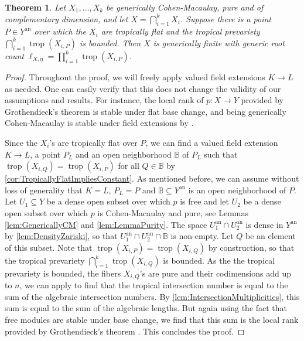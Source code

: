 \documentclass[12pt,reqno,a4paper]{amsart}
\theoremstyle{theoremstyle}
\newtheorem{theorem}{Theorem}[section]
\theoremstyle{examplestyle}
\theoremstyle{algorithmstyle}
\newcommand{\an}{{\mathrm{an}}}
\DeclareMathOperator{\trop}{trop}
\begin{document}
%
\begin{theorem}\label{thm:MainThm1}
  Let $X_1,\dots,X_k$ be generically Cohen-Macaulay, pure and of complementary dimension, and let $X=\bigcap_{i=1}^k X_i$.
  Suppose there is a point $P\in Y^{\an}$ over which the $X_{i}$ are tropically flat and the tropical prevariety $\bigcap_{i=1}^{k}\trop(X_{i,P})$ is bounded.
  Then $X$ is generically finite with generic root count $\ell_{X,\eta}=\prod_{i=1}^{k}\trop(X_{i,P})$.
\end{theorem}
\begin{proof}
Throughout the proof, we will freely apply valued field extensions $K\to L$ as needed. One can easily verify that this does not change the validity of our assumptions and results. For instance, the local  %
rank of $p\colon X\to Y$ provided by Grothendieck's theorem \cite[\href{https://stacks.math.columbia.edu/tag/052A}{Proposition 052A}]{stacks-project} is stable under flat base change, and
%
being generically Cohen-Macaulay is stable under field extensions by   %
%
%
\cite[\href{https://stacks.math.columbia.edu/tag/00RJ}{Lemma 00RJ}]{stacks-project}. %

  Since the $X_{i}$'s are tropically flat over $P$, we can find a valued field extension $K\to  L$, a point $P_{L}$ and an open neighborhood $\mathbb{B}$ of $P_{L}$  such that $\trop(X_{i,Q})=\trop(X_{i,P})$ for all $Q\in \mathbb{B}$ by \cref{cor:TropicallyFlatImpliesConstant}. As mentioned before, we can assume without loss of generality that $K=L$, $P_{L}=P$ and $\mathbb{B}\subseteq Y^{\an}$ is an open neighborhood of $P$.  
  Let $U_{1}\subseteq{Y}$ be a dense open subset over which $p$ is free  \cite[\href{https://stacks.math.columbia.edu/tag/052A}{Proposition 052A}]{stacks-project} and let %
  $U_{2}$ be a dense open subset over which $p$ is Cohen-Macaulay and pure, see Lemmas \ref{lem:GenericallyCM} and \ref{lem:LemmaPurity}. %
  The space  $U^{\mathrm{an}}_{1}\cap{U^{\mathrm{an}}_{2}}$ is dense in $Y^{\mathrm{an}}$ by \cref{lem:DensityZariski}, so that $U^{\mathrm{an}}_{1}\cap U^{\mathrm{an}}_{2}\cap \mathbb{B}$ is non-empty. Let $Q$ be an element of this subset. Note that $\trop(X_{i,P})=\trop(X_{i,Q})$ by construction, so that the tropical prevariety $\bigcap_{i=1}^{k}\trop(X_{i,Q})$ is bounded.  %
  As the %
  the tropical prevariety is bounded, the fibers $X_{i,Q}$'s are pure and their codimensions add up to $n$, we can apply \cite[Corollary 6.13]{OR2013} to find that
  the tropical intersection number is equal to the sum of the algebraic intersection numbers. By \cref{lem:IntersectionMultiplicities}, this sum is equal to the sum of the algebraic lengths. But again using the fact that free modules are stable under base change, we find that this sum is the local rank provided by Grothendieck's theorem \cite[\href{https://stacks.math.columbia.edu/tag/052A}{Proposition 052A}]{stacks-project}. This concludes the proof.
\end{proof}
\end{document}
